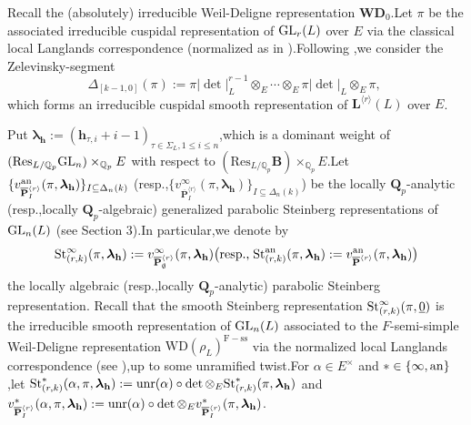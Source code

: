\documentclass[SecEq,CM,GP]{degruyter-crelle} %
\theoremstyle{plain}
\newcommand{\ana}{{\rm an}}
\newcommand{\GLN}{{\rm GL}}
\newcommand{\GL}{{\rm GL}}
\newcommand{\hpi}{{{\mathbf{h}}}}
\newcommand{\lrr}{{\langle r\rangle}}
\newcommand{\op}{{\overline{{\mathbf{P}}}}}
\newcommand{\st}{{\rm St}}
\newcommand{\unr}{{\rm unr}}
\newcommand{\wdre}{{\textbf{WD}}}
\newcommand{\BQ}{{\mathbb{Q}}}
\newcommand{\bB}{{\mathbf{B}}}
\newcommand{\bL}{{\mathbf{L}}}
\newcommand{\bQ}{{\mathbf{Q}}}
\newcommand{\bh}{{\mathbf{h}}}
\begin{document}
Recall the (absolutely) irreducible Weil-Deligne representation $\wdre_0$.\;Let $\pi$ be the associated irreducible cuspidal  representation of $\GLN_r(L)$ over $E$   via the classical local Langlands correspondence (normalized as in \cite{scholze2013local}).\;Following \cite{av1980induced2},\;we consider the Zelevinsky-segment \[\Delta_{[k-1,0]}(\pi):=\pi|\det|_L^{r-1}\otimes_E \cdots \otimes_E \pi|\det|_L \otimes_E \pi,\;\]which forms an irreducible cuspidal smooth representation of $\bL^{\lrr}(L)$ over $E$.\;

Put ${\bm\lambda}_\bh:=(\hpi_{\tau,i}+i-1)_{\tau\in \Sigma_L,1\leq i\leq n}$,\;which is a dominant weight of $(\mathrm{Res}_{L/\BQ_p}\GLN_n)\times_{\BQ_p}E$ with  respect to $(\mathrm{Res}_{L/\BQ_p}\bB)\times_{\BQ_p}E$.\;Let  $\{v^{\ana}_{\op^{\lrr}_{I}}(\pi,{\bm\lambda}_\bh)\}_{I\subseteq {\Delta_n(k)}}$ (resp.,\;$\{v^{\infty}_{\op^{\lrr}_{I}}(\pi,{\bm\lambda}_\bh)\}_{I\subseteq {\Delta_n(k)}}$) be the locally $\bQ_p$-analytic (resp.,\;locally $\bQ_p$-algebraic)
generalized parabolic Steinberg representations of $\GL_n(L)$ (see Section 3).\;In particular,\;we denote by \[\st_{(r,k)}^{\infty}(\pi,{\bm\lambda}_\bh):=v^{\infty}_{\op^{\lrr}_{\emptyset}}(\pi,{\bm\lambda}_\bh) \big(\text{resp.,\;}\st_{(r,k)}^{\ana}(\pi,{\bm\lambda}_\bh):=v^{\ana}_{\op^{\lrr}}(\pi,{\bm\lambda}_\bh)\big)\] the locally algebraic (resp.,\;locally $\bQ_p$-analytic) parabolic Steinberg representation. Recall that the smooth Steinberg representation $\st_{(r,k)}^{\infty}(\pi,\underline{0})$ is the irreducible smooth representation of $\GL_n(L)$ associated
to the $F$-semi-simple Weil-Deligne representation  $\mathrm{WD}(\rho_L)^{\mathrm{F-ss}}$ via the normalized local Langlands correspondence (see \cite{scholze2013local}),\;up to some unramified twist.\;For $\alpha\in E^\times$ and $\ast\in\{\infty,\ana\}$,\;let  $\st_{(r,k)}^{\ast}(\alpha,\pi,{\bm\lambda}_\bh):=\unr(\alpha)\circ\det\otimes_E\st_{(r,k)}^{\ast}(\pi,{\bm\lambda}_\bh)$ and $v^{\ast}_{\op^{\lrr}_{I}}(\alpha,\pi,{\bm\lambda}_\bh):=\unr(\alpha)\circ\det\otimes_Ev^{\ast}_{\op^{\lrr}_{I}}(\pi,{\bm\lambda}_\bh)$.\;
\end{document}
